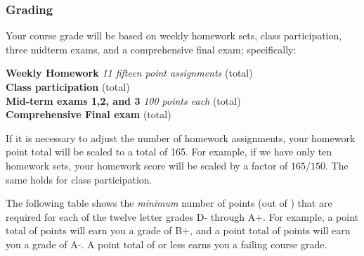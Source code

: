 \documentclass[12pt]{article}
\newcounter{ex}\setcounter{ex}{0}
\newenvironment{mypar}[2]
  {\begin{list}{}%
    {\setlength\leftmargin{#1}
    \setlength\rightmargin{#2}}
    \item[]}
  {\end{list}}
\begin{document}
\subsubsection*{Grading}

Your course grade will be based on weekly homework sets, class participation,
three midterm exams, and a comprehensive 
final exam; specifically:
\begin{mypar}{0.25in}{0.25in}
    \textbf{Weekly Homework}  \emph{11 fifteen point assignments}   (total) \\
    \textbf{Class participation}  (total) \\
    \textbf{Mid-term exams 1,2, and 3} \emph{100 points each}  (total)\\
    \textbf{Comprehensive Final exam}  (total)
\end{mypar}
If it is necessary to adjust the number of  homework assignments,  your homework point 
total will be scaled to a total of 165.  For example, if we have only ten homework sets, 
your homework score will be scaled by a factor of \(165/150\). The same holds
for class participation.





The following table shows the \emph{minimum} number of points (out of \points) that
are required for each of the twelve letter grades D- through A+. For
example, a point total of \Bp\/  points will earn you a grade of B+,  and 
a point total of \Am\/ points will earn you a grade of A-. A point
total of \F\/  or less earns you a failing course grade.
 
\end{document}
